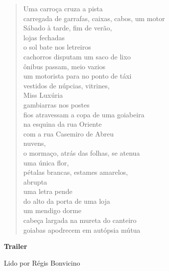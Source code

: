 \begin{verse}
Uma carroça cruza a pista\\
carregada de garrafas, caixas, cabos, um motor\\
Sábado à tarde, fim de verão,\\
lojas fechadas\\[5pt]
o sol bate nos letreiros\\
cachorros disputam um saco de lixo\\
ônibus passam, meio vazios\\
um motorista para no ponto de táxi\\[5pt]
vestidos de núpcias, vitrines,\\
Miss Luxúria\\
gambiarras nos postes\\
fios atravessam a copa de uma goiabeira\\[5pt]
na esquina da rua Oriente\\
com a rua Casemiro de Abreu\\
nuvens,\\
o mormaço, atrás das folhas, se atenua\\[5pt]
uma única flor,\\
pétalas brancas, estames amarelos,\\
abrupta\\
uma letra pende\\[5pt]
do alto da porta de uma loja\\
um mendigo dorme\\
cabeça largada na mureta do canteiro\\
goiabas apodrecem em autópsia mútua
\end{verse}

\pagebreak
\textbf{Trailer}

Lido por Régis Bonvicino


